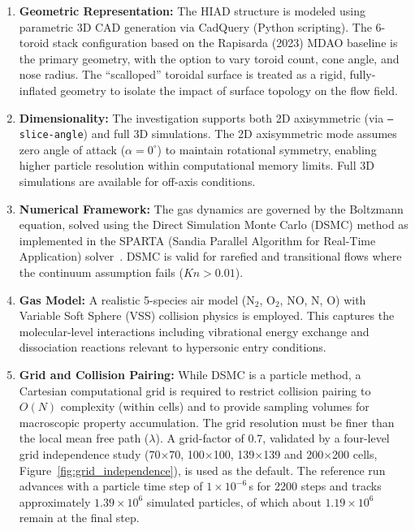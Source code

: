 \begin{enumerate}
    \item \textbf{Geometric Representation:} The HIAD structure is modeled using parametric 3D CAD generation via CadQuery (Python scripting). The 6-toroid stack configuration based on the Rapisarda (2023) MDAO baseline is the primary geometry, with the option to vary toroid count, cone angle, and nose radius. The ``scalloped'' toroidal surface is treated as a rigid, fully-inflated geometry to isolate the impact of surface topology on the flow field.

    \item \textbf{Dimensionality:} The investigation supports both 2D axisymmetric (via \texttt{--slice-angle}) and full 3D simulations. The 2D axisymmetric mode assumes zero angle of attack ($\alpha = 0^\circ$) to maintain rotational symmetry, enabling higher particle resolution within computational memory limits. Full 3D simulations are available for off-axis conditions.

    \item \textbf{Numerical Framework:} The gas dynamics are governed by the Boltzmann equation, solved using the Direct Simulation Monte Carlo (DSMC) method as implemented in the SPARTA (Sandia Parallel Algorithm for Real-Time Application) solver~\cite{plimpton2014sparta}. DSMC is valid for rarefied and transitional flows where the continuum assumption fails ($Kn > 0.01$).

    \item \textbf{Gas Model:} A realistic 5-species air model (N$_2$, O$_2$, NO, N, O) with Variable Soft Sphere (VSS) collision physics is employed. This captures the molecular-level interactions including vibrational energy exchange and dissociation reactions relevant to hypersonic entry conditions.

    \item \textbf{Grid and Collision Pairing:} While DSMC is a particle method, a Cartesian computational grid is required to restrict collision pairing to $O(N)$ complexity (within cells) and to provide sampling volumes for macroscopic property accumulation. The grid resolution must be finer than the local mean free path ($\lambda$). A grid-factor of 0.7, validated by a four-level grid independence study (70$\times$70, 100$\times$100, 139$\times$139 and 200$\times$200 cells, Figure~\ref{fig:grid_independence}), is used as the default. The reference run advances with a particle time step of $1\times10^{-6}$\,s for 2200 steps and tracks approximately $1.39\times10^{6}$ simulated particles, of which about $1.19\times10^{6}$ remain at the final step.


\end{enumerate}
